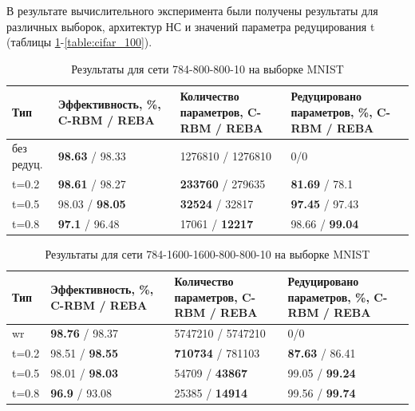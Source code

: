 В результате вычислительного эксперимента были получены результаты для различных выборок, архитектур НС и значений параметра редуцирования t (таблицы \ref{table:mnist_1}-\ref{table:cifar_100}).

\begin{table} [!h]
  \small
  \caption{Результаты для сети 784-800-800-10 на выборке MNIST}\label{table:mnist_1}
\centering
\begin{tabular}{| p{2cm} | p{4cm} | p{4cm} | p{4cm} |}
  \hline
    \textbf{Тип} & \textbf{Эффективность, \%, C-RBM / REBA} & \textbf{Количество параметров, C-RBM / REBA} & \textbf{Редуцировано параметров, \%, C-RBM / REBA}\\
    \hline
    без редуц. & \textbf{98.63} / 98.33 & 1276810 / 1276810 & 0/0\\
    \hline
    t=0.2 & \textbf{98.61} / 98.27 & \textbf{233760} / 279635 & \textbf{81.69} / 78.1\\
    \hline
    t=0.5 & 98.03 / \textbf{98.05} & \textbf{32524} / 32817 & \textbf{97.45} / 97.43\\
    \hline
    t=0.8 & \textbf{97.1} / 96.48 & 17061 / \textbf{12217} & 98.66 / \textbf{99.04}\\
    \hline
\end{tabular}
\end{table}

\begin{table} [!h]
  \small
  \caption{Результаты для сети 784-1600-1600-800-800-10 на выборке MNIST}\label{table:mnist_2}
\centering
\begin{tabular}{| p{2cm} | p{4cm} | p{4cm} | p{4cm} |}
  \hline
    \textbf{Тип} & \textbf{Эффективность, \%, C-RBM / REBA} & \textbf{Количество параметров, C-RBM / REBA} & \textbf{Редуцировано параметров, \%, C-RBM / REBA}\\
    \hline
    wr & \textbf{98.76} / 98.37 & 5747210 / 5747210 & 0/0\\
    \hline
    t=0.2 & 98.51 / \textbf{98.55} & \textbf{710734} / 781103 & \textbf{87.63} / 86.41\\
    \hline
    t=0.5 & 98.01 / \textbf{98.03} & 54709 / \textbf{43867} & 99.05 / \textbf{99.24}\\
    \hline
    t=0.8 & \textbf{96.9} / 93.08 & 25385 / \textbf{14914} & 99.56 / \textbf{99.74}\\
    \hline
\end{tabular}
\end{table}

